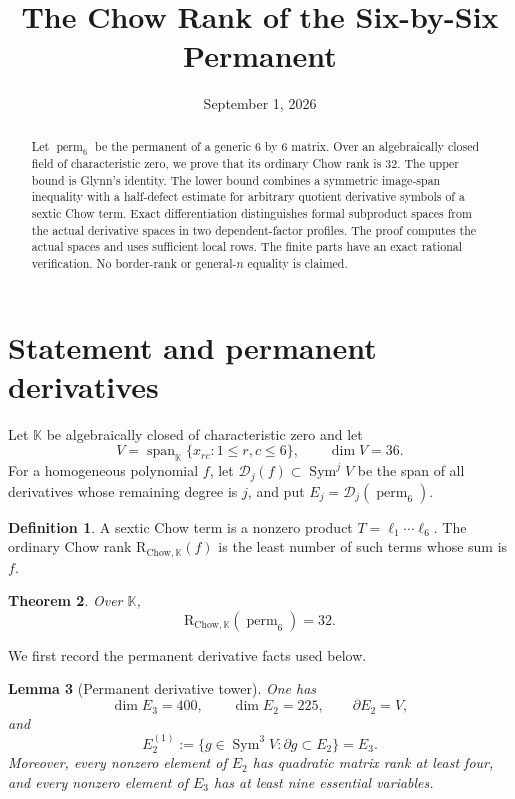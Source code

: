 \documentclass[11pt]{amsart}
\title{The Chow Rank of the Six-by-Six Permanent}
\author{}
\date{September 1, 2026}
\newcommand{\K}{\mathbb{K}}
\newcommand{\Sym}{\operatorname{Sym}}
\newcommand{\Span}{\operatorname{span}}
\newcommand{\perm}{\operatorname{perm}}
\newcommand{\CR}{\mathrm{R}_{\mathrm{Chow},\K}}
\newcommand{\cD}{\mathcal{D}}
\newtheorem{theorem}{Theorem}[section]
\newtheorem{lemma}[theorem]{Lemma}
\theoremstyle{definition}
\newtheorem{definition}[theorem]{Definition}
\begin{document}
\begin{abstract}
Let \(\perm_6\) be the permanent of a generic \(6\) by \(6\) matrix.
Over an algebraically closed field of characteristic zero, we prove that its
ordinary Chow rank is \(32\). The upper bound is Glynn's identity. The lower
bound combines a symmetric image-span inequality with a half-defect estimate
for arbitrary quotient derivative symbols of a sextic Chow term. Exact
differentiation distinguishes formal subproduct spaces from the actual
derivative spaces in two dependent-factor profiles. The proof computes the
actual spaces and uses sufficient local rows. The finite parts have an exact
rational verification. No
border-rank or general-\(n\) equality is claimed.
\end{abstract}

\maketitle

\section{Statement and permanent derivatives}

Let \(\K\) be algebraically closed of characteristic zero and let
\[
 V=\Span_{\K}\{x_{rc}:1\le r,c\le6\},\qquad \dim V=36.
\]
For a homogeneous polynomial \(f\), let \(\cD_j(f)\subset\Sym^jV\) be the
span of all derivatives whose remaining degree is \(j\), and put
\(E_j=\cD_j(\perm_6)\).

\begin{definition}
A sextic Chow term is a nonzero product \(T=\ell_1\cdots\ell_6\). The
ordinary Chow rank \(\CR(f)\) is the least number of such terms whose sum is
\(f\).
\end{definition}

\begin{theorem}\label{thm:main}
Over \(\K\),
\[
 \boxed{\CR(\perm_6)=32.}
\]
\end{theorem}

We first record the permanent derivative facts used below.

\begin{lemma}[Permanent derivative tower]\label{lem:tower}
One has
\[
 \dim E_3=400,\qquad \dim E_2=225,\qquad
 \partial E_2=V,
\]
and
\[
 E_2^{(1)}:=\{g\in\Sym^3V:\partial g\subset E_2\}=E_3. \tag{1.1}
\]
Moreover, every nonzero element of \(E_2\) has quadratic matrix rank at
least four, and every nonzero element of \(E_3\) has at least nine essential
variables.
\end{lemma}
\end{document}
